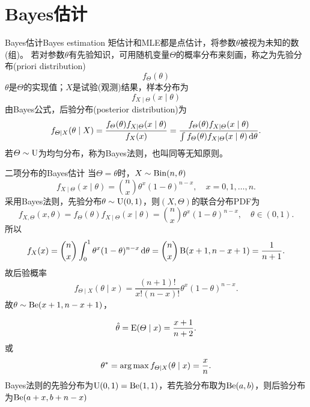 \section{Bayes估计}

\begin{definition}
	{Bayes估计}{Bayes estimation}
	矩估计和MLE都是点估计，将参数$\theta$被视为未知的数(组)。
	若对参数$\theta$有先验知识，可用随机变量$\varTheta$的概率分布来刻画，称之为先验分布(priori distribution)
	\[
		f_\varTheta(\theta)
	\]
	$\theta$是$\varTheta$的实现值；$X$是试验(观测)结果，样本分布为
	\[
		f_{X\mid\varTheta}(x \mid \theta)
	\]
	由Bayes公式，后验分布(posterior distribution)为
	\begin{equation}
		f_{\varTheta\mid X}(\theta \mid X) = \frac{f_\varTheta(\theta)f_{X\mid\varTheta}(x \mid \theta)}{f_X(x)} = \frac{f_\varTheta(\theta)f_{X\mid\varTheta}(x \mid \theta)}{\textstyle\int f_\varTheta(\theta)f_{X\mid\varTheta}(x \mid \theta)\mathop{}\!\mathrm{d}\theta}.
	\end{equation}
	若$\varTheta \sim \operatorname{U}$为均匀分布，称为Bayes法则，也叫同等无知原则。
\end{definition}

\begin{example}{二项分布的Bayes估计}{}
	当$\varTheta = \theta$时，$X \sim \operatorname{Bin}(n,\theta)$
	\[
		f_{X\mid\varTheta}(x \mid \theta) = \binom nx\theta^x(1 - \theta)^{n-x},\quad x = 0,1,\ldots,n.
	\]
	采用Bayes法则，先验分布$\theta \sim \operatorname{U}(0,1)$，则$(X,\varTheta)$的联合分布PDF为
	\[
		f_{X,\varTheta}(x,\theta) = f_{\varTheta}(\theta)f_{X\mid\varTheta}(x \mid \theta) = \binom nx\theta^x(1 - \theta)^{n-x},\quad\theta \in (0,1).
	\]
	所以
	\[
		f_X(x) = \binom nx\int_0^1\theta^x(1 - \theta)^{n-x}\mathop{}\!\mathrm{d}\theta = \binom nx\operatorname{B}(x + 1,n - x + 1) = \frac1{n + 1}.
	\]
	故后验概率
	\begin{equation}\label{eq:ps-beta-binomial-posterior}
		f_{\varTheta\mid X}(\theta \mid x) = \frac{(n + 1)!}{x!(n - x)!}\theta^x(1 - \theta)^{n-x}.
	\end{equation}
	故$\theta \sim \operatorname{Be}(x + 1,n - x + 1)$，
	
	\begin{equation}\label{eq:ps-posterior-mean-uniform-prior}
		\hat\theta = \operatorname{E}(\varTheta \mid x) = \frac{x + 1}{n + 2}.
	\end{equation}
	或
	\[
		\theta^\ast = \operatorname*{arg\,max} f_{\varTheta\mid X}(\theta \mid x) = \frac xn.
	\]
	\tcblower
	Bayes法则的先验分布为$\operatorname{U}(0,1) = \operatorname{Be}(1,1)$，若先验分布取为$\operatorname{Be}(a,b)$，则后验分布为$\operatorname{Be}(a + x,b + n - x)$
\end{example}

